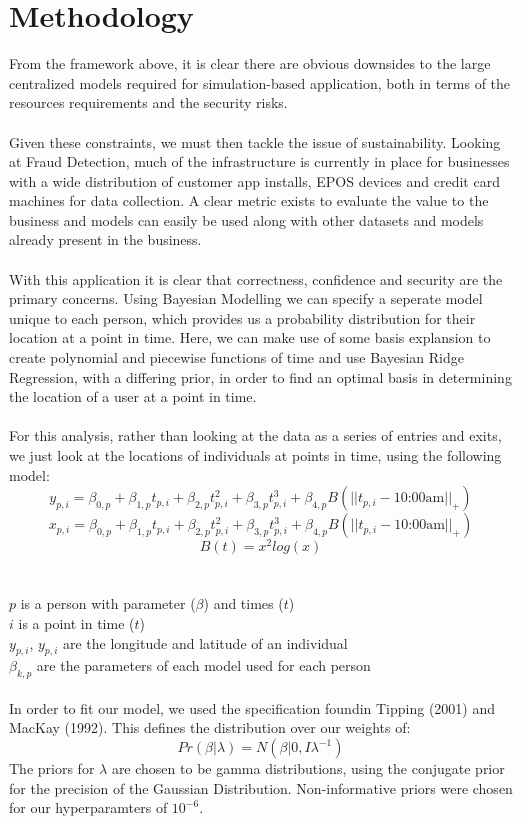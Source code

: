\documentclass[12pt]{report}
\begin{document}
\section{Methodology}
From the framework above, it is clear there are obvious downsides to the large centralized models required for simulation-based application, both in terms of the resources requirements and the security risks.  \\
\\
Given these constraints, we must then tackle the issue of sustainability.  Looking at Fraud Detection, much of the infrastructure is currently in place for businesses with a wide distribution of customer app installs, EPOS devices and credit card machines for data collection.  A clear metric exists to evaluate the value to the business and models can easily be used along with other datasets and models already present in the business.  \\
\\
With this application it is clear that correctness, confidence and security are the primary concerns.  Using Bayesian Modelling we can specify a seperate model unique to each person, which provides us a probability distribution for their location at a point in time.  Here, we can make use of some basis explansion to create polynomial and piecewise functions of time and use Bayesian Ridge Regression, with a differing prior, in order to find an optimal basis in determining the location of a user at a point in time.  \\
\\
For this analysis, rather than looking at the data as a series of entries and exits, we just look at the locations of individuals at points in time, using the following model:  
$$y_{p,i} = \beta_{0,p} + \beta_{1,p} t_{p,i} + \beta_{2,p} t_{p,i}^2 + \beta_{3,p} t_{p,i}^3 + \beta_{4,p} B(||t_{p,i}-\text{10:00am}||_{+})$$  
$$x_{p,i} = \beta_{0,p} + \beta_{1,p} t_{p,i} + \beta_{2,p} t_{p,i}^2 + \beta_{3,p} t_{p,i}^3 + \beta_{4,p} B(||t_{p,i}-\text{10:00am}||_{+})$$  
$$B(t) = x^2 log(x)$$\\
  \\
$p$ is a person with parameter ($\beta$) and times ($t$)\\
$i$ is a point in time ($t$)  \\
$y_{p,i}$, $y_{p,i}$ are the longitude and latitude of an individual\\
$\beta_{k,p}$ are the parameters of each model used for each person\\
\\
In order to fit our model, we used the specification foundin Tipping (2001) and MacKay (1992).  This defines the distribution over our weights of:\\
$$Pr(\beta|\lambda) = N(\beta|0,I\lambda^{-1})$$
The priors for $\lambda$ are chosen to be gamma distributions, using the conjugate prior for the precision of the Gaussian Distribution.  Non-informative priors were chosen for our hyperparamters of $10^{-6}$.  \\
\end{document}
